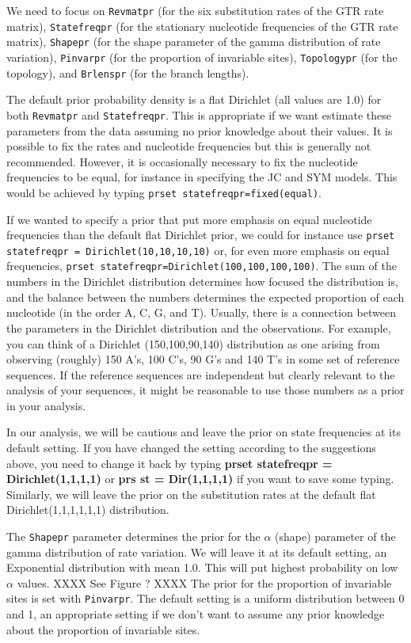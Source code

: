 \documentclass[12pt]{book}
\begin{document}
We need to focus on \texttt{Revmatpr} (for the six substitution rates of the GTR rate matrix),
 \texttt{Statefreqpr} (for the stationary nucleotide frequencies of the GTR rate matrix), \texttt{Shapepr}
 (for the shape parameter of the gamma distribution of rate variation), \texttt{Pinvarpr}
 (for the proportion of invariable sites), \texttt{Topologypr} (for the topology), and \texttt{Brlenspr}
 (for the branch lengths).

The default prior probability density is a flat Dirichlet (all values are 1.0) for both \texttt{Revmatpr}
 and \texttt{Statefreqpr}. This is appropriate if we want estimate these parameters from the data assuming
 no prior knowledge about their values. It is possible to fix the rates and nucleotide frequencies but this
 is generally not recommended. However, it is occasionally necessary to fix the nucleotide frequencies to
 be equal, for instance in specifying the JC and SYM models. This would be achieved by typing
 \texttt{prset statefreqpr=fixed(equal)}.

If we wanted to specify a prior that put more emphasis on equal nucleotide frequencies than the default
 flat Dirichlet prior, we could for instance use \texttt{prset statefreqpr = Dirichlet(10,10,10,10)} or,
 for even more emphasis on equal frequencies, \texttt{prset statefreqpr=Dirichlet(100,100,100,100)}. The
 sum of the numbers in the Dirichlet distribution determines how focused the distribution is, and the
 balance between the numbers determines the expected proportion of each nucleotide (in the order A, C, G,
 and T). Usually, there is a connection between the parameters in the Dirichlet distribution and the
 observations. For example, you can think of a Dirichlet (150,100,90,140) distribution as one arising from
 observing (roughly) 150 A's, 100 C's, 90 G's and 140 T's in some set of reference sequences. If the
 reference sequences are independent but clearly relevant to the analysis of your sequences, it might be
 reasonable to use those numbers as a prior in your analysis. 

In our analysis, we will be cautious and leave the prior on state frequencies at its default setting. If you
 have changed the setting according to the suggestions above, you need to change it back by typing
 \textbf{prset statefreqpr = Dirichlet(1,1,1,1)} or \textbf{prs st = Dir(1,1,1,1)} if you want to save some
 typing. Similarly, we will leave the prior on the substitution rates at the default flat
 Dirichlet(1,1,1,1,1,1) distribution.

The \texttt{Shapepr} parameter determines the prior for the $\alpha$ (shape) parameter of the gamma
 distribution of rate variation. We will leave it at its default setting, an Exponential distribution
 with mean 1.0. This will put highest probability on low $\alpha$ values. XXXX See Figure ? XXXX
 The prior for the proportion of invariable sites is set with
 \texttt{Pinvarpr}. The default setting is a uniform distribution between 0 and 1, an appropriate setting
 if we don't want to assume any prior knowledge about the proportion of invariable sites.
\end{document}
